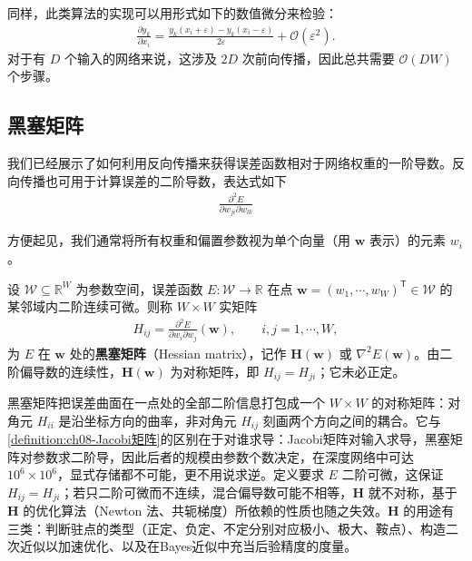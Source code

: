 \documentclass[../../main.tex]{subfiles}
\begin{document}
同样，此类算法的实现可以用形式如下的数值微分来检验：
\begin{align}
\frac{\partial y_k}{\partial x_i}=\frac{y_k\left(x_i+\varepsilon\right)-y_k\left(x_i-\varepsilon\right)}{2\varepsilon}+\mathcal{O}\left(\varepsilon^{2}\right).
\label{align:ch08-Jacobi数值}
\end{align}
对于有 $D$ 个输入的网络来说，这涉及 $2D$ 次前向传播，因此总共需要 $\mathcal{O}(DW)$ 个步骤。

\subsection{黑塞矩阵}\label{subsection:ch08-黑塞矩阵}

我们已经展示了如何利用反向传播来获得误差函数相对于网络权重的一阶导数。反向传播也可用于计算误差的二阶导数，表达式如下
\begin{align}
\frac{\partial^{2}E}{\partial w_{ji}\partial w_{lk}}
\label{align:ch08-二阶导数}
\end{align}

方便起见，我们通常将所有权重和偏置参数视为单个向量（用 $\mathbf{w}$ 表示）的元素 $w_i$。

\begin{definition}[黑塞矩阵]\label{definition:ch08-黑塞矩阵}
设 $\mathcal{W}\subseteq\mathbb{R}^{W}$ 为参数空间，误差函数 $E:\mathcal{W}\to\mathbb{R}$ 在点 $\mathbf{w}=(w_1,\cdots,w_W)^{\mathsf T}\in\mathcal{W}$ 的某邻域内二阶连续可微。则称 $W\times W$ 实矩阵
\begin{align}
H_{ij}=\frac{\partial^{2}E}{\partial w_i\partial w_j}(\mathbf{w}),\qquad i,j=1,\cdots,W,
\label{align:ch08-黑塞}
\end{align}
为 $E$ 在 $\mathbf{w}$ 处的\textbf{黑塞矩阵}（Hessian matrix），记作 $\mathbf{H}(\mathbf{w})$ 或 $\nabla^{2}E(\mathbf{w})$。由二阶偏导数的连续性，$\mathbf{H}(\mathbf{w})$ 为对称矩阵，即 $H_{ij}=H_{ji}$；它未必正定。
\end{definition}

\begin{remark}
黑塞矩阵把误差曲面在一点处的全部二阶信息打包成一个 $W\times W$ 的对称矩阵：对角元 $H_{ii}$ 是沿坐标方向的曲率，非对角元 $H_{ij}$ 刻画两个方向之间的耦合。它与\cref{definition:ch08-Jacobi矩阵}的区别在于对谁求导：Jacobi矩阵对输入求导，黑塞矩阵对参数求二阶导，因此后者的规模由参数个数决定，在深度网络中可达 $10^{6}\times10^{6}$，显式存储都不可能，更不用说求逆。定义要求 $E$ 二阶可微，这保证 $H_{ij}=H_{ji}$；若只二阶可微而不连续，混合偏导数可能不相等，$\mathbf{H}$ 就不对称，基于 $\mathbf{H}$ 的优化算法（Newton 法、共轭梯度）所依赖的性质也随之失效。$\mathbf{H}$ 的用途有三类：判断驻点的类型（正定、负定、不定分别对应极小、极大、鞍点）、构造二次近似以加速优化、以及在Bayes近似中充当后验精度的度量。
\end{remark}
\end{document}
